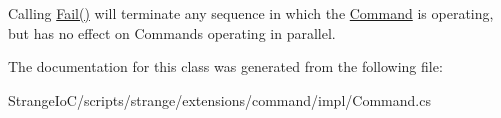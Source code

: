 Calling {\ttfamily \hyperlink{classstrange_1_1extensions_1_1command_1_1impl_1_1_command_a09ff0edefacd05382f9f978bab8195ff}{Fail()}} will terminate any sequence in which the \hyperlink{classstrange_1_1extensions_1_1command_1_1impl_1_1_command}{Command} is operating, but has no effect on Commands operating in parallel. 

The documentation for this class was generated from the following file\-:\begin{DoxyCompactItemize}
\item 
Strange\-Io\-C/scripts/strange/extensions/command/impl/Command.\-cs\end{DoxyCompactItemize}
